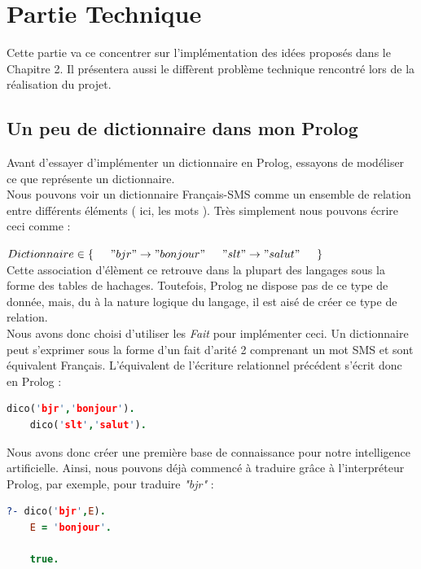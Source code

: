 \documentclass[11pt]{report}
\begin{document}
\chapter{Partie Technique}
Cette partie va ce concentrer sur l'implémentation des idées proposés dans le Chapitre 2. Il présentera aussi le diffèrent problème technique rencontré lors de la réalisation du projet.

	\section{Un peu de dictionnaire dans mon Prolog}
	Avant d'essayer d'implémenter un dictionnaire en Prolog, essayons de modéliser ce que représente un dictionnaire.\\
	Nous pouvons voir un dictionnaire Français-SMS comme un ensemble de relation entre différents éléments ( ici, les mots ). Très simplement nous pouvons écrire ceci comme :\\
	\smallskip
	
		$ 
			Dictionnaire \in \{ \\
			\indent	"bjr" \rightarrow "bonjour"\\
			\indent "slt" \rightarrow "salut"\\
			\indent \}
		$\\
	
	\noindent Cette association d'élèment ce retrouve dans la plupart des langages sous la forme des tables de hachages. Toutefois, Prolog ne dispose pas de ce type de donnée, mais, du à la nature logique du langage, il est aisé de créer ce type de relation.\\
	Nous avons donc choisi d'utiliser les \emph{Fait} pour implémenter ceci. Un dictionnaire peut s'exprimer sous la forme d'un fait d'arité 2 comprenant un mot SMS et sont équivalent Français. L'équivalent de l'écriture relationnel précédent s'écrit donc en Prolog :\\
	
	\begin{lstlisting}[language=Prolog]
	dico('bjr','bonjour').
	dico('slt','salut').
	\end{lstlisting}
	
	Nous avons donc créer une première base de connaissance pour notre intelligence artificielle. Ainsi, nous pouvons déjà commencé à traduire grâce à l’interpréteur Prolog, par exemple, pour traduire {\em "bjr"} :
	\begin{lstlisting}[language=Prolog]
	?- dico('bjr',E).
	E = 'bonjour'.
	
	true.
	\end{lstlisting}
	
\end{document}
